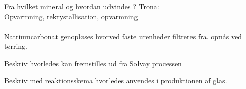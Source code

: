 \begin{flashcard}[Fremstilling]{Fra hvilket mineral og hvordan udvindes ?}
Trona: \\ \vspace{7pt}
Opvarmning, rekrystallisation, opvarmning\\
\\
Natriumcarbonat genopløses hvorved faste urenheder filtreres fra.  opnås ved tørring.\\
\end{flashcard}

\begin{flashcard}[Fremstilling]{Beskriv hvorledes  kan fremstilles ud fra Solvay processen}
\end{flashcard}

\begin{flashcard}[Anvendelse]{Beskriv med reaktionsskema hvorledes  anvendes i produktionen af glas.}
\end{flashcard}